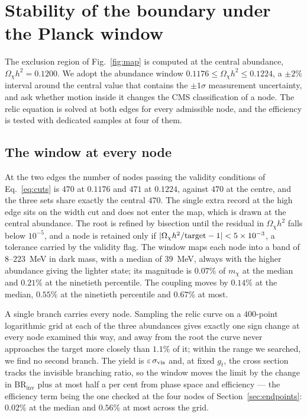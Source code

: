 \section{Stability of the boundary under the Planck window}\label{sec:window}

The exclusion region of Fig.~\ref{fig:map} is computed at the central abundance, $\Omega_\chi h^2=0.1200$. We adopt the abundance window $0.1176\le\Omega_\chi h^2\le0.1224$, a $\pm2\%$ interval around the central value that contains the $\pm1\sigma$ measurement uncertainty, and ask whether motion inside it changes the CMS classification of a node. The relic equation is solved at both edges for every admissible node, and the efficiency is tested with dedicated samples at four of them.

\subsection{The window at every node}

At the two edges the number of nodes passing the validity conditions of Eq.~\eqref{eq:cuts} is $470$ at $0.1176$ and $471$ at $0.1224$, against $470$ at the centre, and the three sets share exactly the central $470$. The single extra record at the high edge sits on the width cut and does not enter the map, which is drawn at the central abundance. The root is refined by bisection until the residual in $\Omega_\chi h^2$ falls below $10^{-5}$, and a node is retained only if $|{\Omega_\chi h^2}/{\rm target}-1|<5\times10^{-3}$, a tolerance carried by the validity flag. The window maps each node into a band of $8$--$223$~MeV in dark mass, with a median of $39$~MeV, always with the higher abundance giving the lighter state; its magnitude is $0.07\%$ of $m_\chi$ at the median and $0.21\%$ at the ninetieth percentile. The coupling moves by $0.14\%$ at the median, $0.55\%$ at the ninetieth percentile and $0.67\%$ at most.

A single branch carries every node. Sampling the relic curve on a $400$-point logarithmic grid at each of the three abundances gives exactly one sign change at every node examined this way, and away from the root the curve never approaches the target more closely than $1.1\%$ of it; within the range we searched, we find no second branch. The yield is $\varepsilon\,\sigma_{\rm vis}$ and, at fixed $g_t$, the cross section tracks the invisible branching ratio, so the window moves the limit by the change in $\mathrm{BR_{inv}}$ plus at most half a per cent from phase space and efficiency — the efficiency term being the one checked at the four nodes of Section~\ref{sec:endpoints}: $0.02\%$ at the median and $0.56\%$ at most across the grid.

